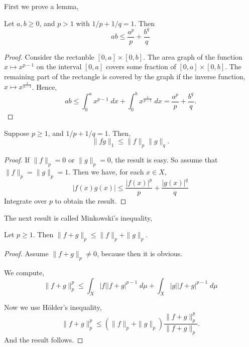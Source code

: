 \documentclass{owmaths}
\begin{document}
First we prove a lemma,
\begin{lemma}
    Let $a,b \geq 0$, and $p > 1$ with $1/p+1/q = 1$. Then
    \begin{equation*}
        ab \leq \frac{a^p}{p}+\frac{b^q}{q}
    \end{equation*}
\end{lemma}
\begin{proof}
    Consider the rectanble $[0,a]\times [0,b]$. The area graph of the function $x\mapsto x^{p-1}$
    on the interval $[0,a]$ covers some fraction of $[0,a]\times [0,b]$. The remaining
    part of the rectangle is covered by the graph if the inverse function, $x\mapsto x^{\frac{1}{p-1}}$.
    Hence,
    \begin{equation*}
        ab\leq \int_0^a x^{p-1}\;dx + \int_0^{b} x^{\frac{1}{p-1}}\;dx = \frac{a^p}{p}+\frac{b^q}{q}.
    \end{equation*}
\end{proof}
\begin{proposition}
    Suppose $p \geq 1$, and $1/p + 1/q = 1$. Then,
    \begin{equation*}
        \|fg\|_1 \leq \|f\|_p\|g\|_q.
    \end{equation*}
\end{proposition}
\begin{proof}
    If $\|f\|_p = 0$ or $\|g\|_p = 0$, the result is easy. So assume
    that $\|f\|_p = \|g\|_p = 1$. Then we have, for each $x \in X$,
    \begin{equation*}
        |f(x)g(x)| \leq \frac{|f(x)|^p}{p}+\frac{|g(x)|^q}{q}
    \end{equation*}
    Integrate over $p$ to obtain the result.
\end{proof}

The next result is called Minkowski's inequality,
\begin{proposition}
    Let $p\geq 1$. Then $\|f+g\|_p \leq \|f\|_p + \|g\|_p$.
\end{proposition}
\begin{proof}
    Assume $\|f+g\|_p \neq 0$, because then it is obvious. 
    
    We compute,
    \begin{equation*}
        \|f+g\|_p^p \leq \int_{X} |f||f+g|^{p-1}\;d\mu + \int_X |g||f+g|^{p-1}\;d\mu
    \end{equation*}
    
    Now we use H\"older's inequality,
    \begin{equation*}
        \|f+g\|_p^p \leq (\|f\|_p+\|g\|_p)\frac{\|f+g\|_p^p}{\|f+g\|_p}.
    \end{equation*}
    And the result follows.
\end{proof}
\end{document}
